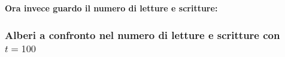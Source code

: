 \textbf{Ora invece guardo il numero di letture e scritture:}

\subsubsection{Alberi a confronto nel numero di letture e scritture con $t = 100$}

